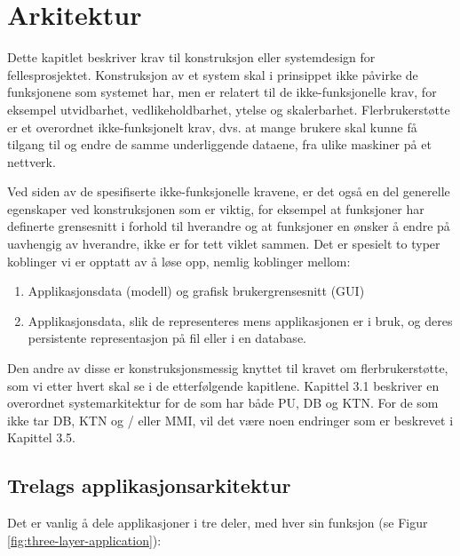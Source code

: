 \section{Arkitektur}
Dette kapitlet beskriver krav til konstruksjon eller systemdesign for fellesprosjektet. Konstruksjon av et system skal i prinsippet ikke påvirke de funksjonene som systemet har, men er relatert til de ikke-funksjonelle krav, for eksempel utvidbarhet, vedlikeholdbarhet, ytelse og skalerbarhet. Flerbrukerstøtte er et overordnet ikke-funksjonelt krav, dvs. at mange brukere skal kunne få tilgang til og endre de samme underliggende dataene, fra ulike maskiner på et nettverk.

Ved siden av de spesifiserte ikke-funksjonelle kravene, er det også en del generelle egenskaper ved konstruksjonen som er viktig, for eksempel at funksjoner har definerte grensesnitt i forhold til hverandre og at funksjoner en ønsker å endre på uavhengig av hverandre, ikke er for tett viklet sammen. Det er spesielt to typer koblinger vi er opptatt av å løse opp, nemlig koblinger mellom:

\begin{enumerate}

\item
Applikasjonsdata (modell) og grafisk brukergrensesnitt (GUI)

\item
Applikasjonsdata, slik de representeres mens applikasjonen er i bruk, og deres persistente representasjon på fil eller i en database. 

\end{enumerate}

Den andre av disse er konstruksjonsmessig knyttet til kravet om flerbrukerstøtte, som vi etter hvert skal se i de etterfølgende kapitlene. Kapittel 3.1 beskriver en overordnet systemarkitektur for de som har både PU, DB og KTN. For de som ikke tar DB, KTN og / eller MMI, vil det være noen endringer som er beskrevet i Kapittel 3.5.

\subsection{Trelags applikasjonsarkitektur}

Det er vanlig å dele applikasjoner i tre deler, med hver sin funksjon (se Figur \ref{fig:three-layer-application}):

